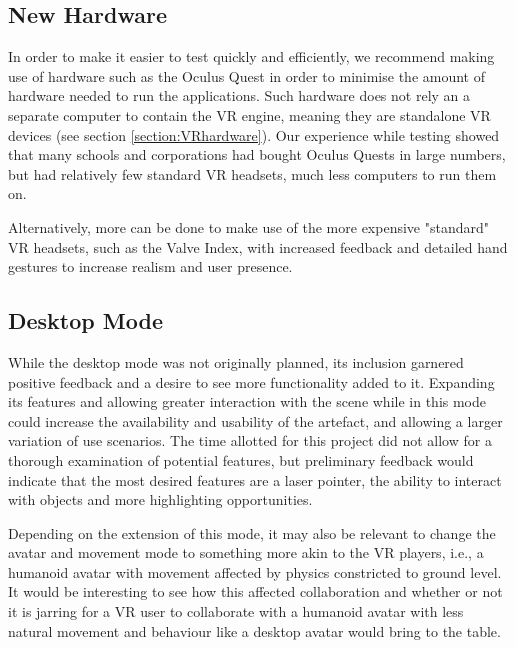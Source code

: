 \subsection{New Hardware}
In order to make it easier to test quickly and efficiently, we recommend making use of hardware such as the Oculus Quest \cite{hillmann2019comparing} in order to minimise the amount of hardware needed to run the applications. Such hardware does not rely an a separate computer to contain the VR engine, meaning they are standalone VR devices (see section \ref{section:VRhardware}). Our experience while testing showed that many schools and corporations had bought Oculus Quests in large numbers, but had relatively few standard VR headsets, much less computers to run them on. 

Alternatively, more can be done to make use of the more expensive "standard" VR headsets, such as the Valve Index, with increased feedback and detailed hand gestures to increase realism and user presence.

\subsection{Desktop Mode}
While the desktop mode was not originally planned, its inclusion garnered positive feedback and a desire to see more functionality added to it. Expanding its features and allowing greater interaction with the scene while in this mode could increase the availability and usability of the artefact, and allowing a larger variation of use scenarios. The time allotted for this project did not allow for a thorough examination of potential features, but preliminary feedback would indicate that the most desired features are a laser pointer, the ability to interact with objects and more highlighting opportunities.

Depending on the extension of this mode, it may also be relevant to change the avatar and movement mode to something more akin to the VR players, i.e., a humanoid avatar with movement affected by physics constricted to ground level. It would be interesting to see how this affected collaboration and whether or not it is jarring for a VR user to collaborate with a humanoid avatar with less natural movement and behaviour like a desktop avatar would bring to the table.


\cleardoublepage